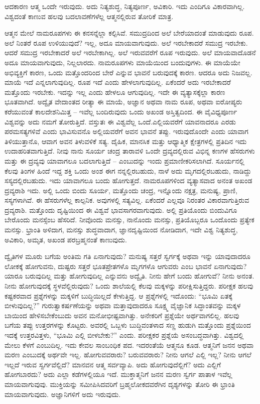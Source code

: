 ಆದಕಾರಣ ಆತ್ಮ ಒಂದೇ ಇರುವುದು. ಅದು ನಿತ್ಯಶುದ್ಧ, ನಿತ್ಯಪೂರ್ಣ, ಅವಿಕಾರಿ. ಇದು ಎಂದಿಗೂ ವಿಕಾರವಾಗಿಲ್ಲ. ವಿಶ್ವದಂತೆ ಕಾಣುವ ಹಲವು ಬದಲಾವಣೆಗಳೆಲ್ಲ ಆತ್ಮನಲ್ಲಿರುವ ತೋರಿಕೆ ಮಾತ್ರ.

ಆತ್ಮನ ಮೇಲೆ ನಾಮರೂಪಗಳು ಈ ಕನಸನ್ನೆಲ್ಲಾ ಕಲ್ಪಿಸಿವೆ. ಸಮುದ್ರದಿಂದ ಅಲೆ ಬೇರೆಯಾದಂತೆ ಮಾಡುವುದು ರೂಪ. ಅಲೆ ನಿಂತರೆ ರೂಪ ಉಳಿಯುವುದೆ? ಇಲ್ಲ, ಅದೂ ಮಾಯವಾಗುವುದು. ಅಲೆ ಇರಬೇಕಾದರೆ ಸಮುದ್ರ ಇರಬೇಕು. ಆದರೆ ಸಮುದ್ರ ಇರಬೇಕಾದರೆ ಅಲೆ ಇರಬೇಕಾಗಿಲ್ಲ. ಅಲೆ ಇರುವವರೆಗೆ ರೂಪ ಇರುವುದು. ಅಲೆ ಮಾಯವಾದೊಡನೆ ಅದೂ ಮಾಯವಾಗುವುದು, ನಿಲ್ಲಲಾರದು. ನಾಮರೂಪಗಳು ಮಾಯೆಯಿಂದ ಬಂದುವುಗಳು. ಈ ಮಾಯೆಯೇ ಅಭಿವ್ಯಕ್ತಿಗೆ ಕಾರಣ, ಒಂದು ಮತ್ತೊಂದರಿಂದ ಬೇರೆ ಎನ್ನುವ ಭಾವನೆ ಬರುವುದಕ್ಕೆ ಕಾರಣ. ಆದರೂ ಅದು ನಿಜವಲ್ಲ. ಮಾಯೆ ಇದೆ ಎನ್ನಲಾಗುವುದಿಲ್ಲ. ರೂಪ ಇದೆ ಎಂದು ಹೇಳಲಾಗುವುದಿಲ್ಲ. ಏಕೆಂದರೆ ಅದು ಇರಬೇಕಾದರೆ ಮತ್ತೊಂದು ಇರಬೇಕು. ಇದನ್ನು ಇಲ್ಲ ಎಂದು ಹೇಳಲೂ ಆಗುವುದಿಲ್ಲ. ಇದೇ ಈ ವ್ಯತ್ಯಾಸಕ್ಕೆಲ್ಲಾ ಕಾರಣ ಭೂತವಾಗಿದೆ. ಅದ್ವೈತ ವೇದಾಂತದ ರೀತ್ಯಾ ಈ ಮಾಯೆ, ಅಜ್ಞಾನ ಅಥವಾ ನಾಮ ರೂಪ, ಅಥವಾ ಐರೋಪ್ಯರು ಕರೆಯುವಂತೆ ಕಾಲದೇಶನಿಮಿತ್ತ – ಇವೆಲ್ಲ ಬಂದಿರುವುದು ಒಂದು ಅಖಂಡ ಅಸ್ತಿತ್ವದಿಂದ. ಈ ವೈವಿಧ್ಯಪೂರ್ಣ ವಿಶ್ವವನ್ನು ಅದು ನಮಗೆ ತೋರುತ್ತಿದೆ. ವಸ್ತುತಃ ಈ ವಿಶ್ವವೆಲ್ಲ ಒಂದೆ.ಎಲ್ಲಿಯವರೆಗೆ ಯಾವನಾದರೂ ಎರಡು ಪರಮಸತ್ಯಗಳಿವೆ ಎಂದು ಭಾವಿಸುವನೊ ಅಲ್ಲಿಯವರೆಗೆ ಅವನ ಭಾವನೆ ತಪ್ಪು. ಇರುವುದೊಂದೇ ಎಂದು ಯಾವಾಗ ತಿಳಿಯುತ್ತಾನೊ, ಆವಾಗ ಅವನ ತಿಳುವಳಿಕೆ ಸತ್ಯ. ದೈಹಿಕ, ಮಾನಸಿಕ ಮತ್ತು ಆಧ್ಯಾತ್ಮಿಕ ಕ್ಷೇತ್ರಗಳಲ್ಲಿ ಪ್ರತಿದಿನ ಇದು ಉದಾಹರಿತವಾಗುತ್ತಿದೆ. ನೀವು ನಾನು ಸೂರ್ಯ ಚಂದ್ರ ತಾರಾವಳಿ ಒಂದೇ ದ್ರವ್ಯದಲ್ಲಿರುವ ವಿಭಿನ್ನ ಕಣಗಳ ಹೆಸರುಗಳು ಮತ್ತು ಈ ದ್ರವ್ಯವು ಯಾವಾಗಲೂ ಬದಲಾಗುತ್ತಿದೆ – ಎಂಬುದನ್ನು ಇಂದು ಪ್ರಮಾಣೀಕರಿಸಲಾಗಿದೆ. ಸೂರ್ಯನಲ್ಲಿ ಕೆಲವು ತಿಂಗಳ ಹಿಂದೆ ಇದ್ದ ಶಕ್ತಿ ಒಂದು ಅಂಶ ಈಗ ನನ್ನಲ್ಲಿರಬಹುದು, ನಾಳೆ ಅದು ಮೃಗದಲ್ಲಿರಬಹುದು, ನಾಡಿದ್ದು ಸಸ್ಯದಲ್ಲಿರಬಹುದು. ಇದು ಯಾವಾಗಲೂ ಬಂದು ಹೋಗುತ್ತದೆ. ನಾಮರೂಪಗಳಿಂದ ವ್ಯತ್ಯಾಸವಾದ ಅನಂತ ಅಖಂಡ ದ್ರವ್ಯರಾಶಿ ಇದು. ಅಲ್ಲಿ ಒಂದು ಬಿಂದು ಸೂರ್ಯ, ಮತ್ತೊಂದು ಚಂದ್ರ, ಇನ್ನೊಂದು ನಕ್ಷತ್ರ, ಮನುಷ್ಯ, ಪ್ರಾಣಿ, ಸಸ್ಯಗಳಾಗಿವೆ. ಈ ಹೆಸರುಗಳೆಲ್ಲ ಕಾಲ್ಪನಿಕ. ಅವುಗಳಲ್ಲಿ ಸತ್ಯವಿಲ್ಲ. ಏಕೆಂದರೆ ಎಲ್ಲವೂ ನಿರಂತರ ವಿಕಾರವಾಗುತ್ತಿರುವ ದ್ರವ್ಯರಾಶಿ. ಮತ್ತೊಂದು ದೃಷ್ಟಿಯಿಂದ ಈ ವಿಶ್ವವೆ ಭಾವಸಾಗರವಾಗುವುದು. ಅಲ್ಲಿ ಪ್ರತಿಯೊಂದು ಬಿಂದುವಿಗೂ ಬೇರೊಂದು ಮನಸ್ಸೆಂಬ ಹೆಸರಿದೆ. ನೀವೊಂದು ಮನಸ್ಸು, ನಾನೊಂದು ಮನಸ್ಸು, ಪ್ರತಿಯೊಬ್ಬರೂ ಒಂದೊಂದು ಪ್ರತ್ಯೇಕ ಮನಸ್ಸು. ಭ್ರಾಂತಿ ಅಳಿದಾಗ, ಮನಸ್ಸು ಶುದ್ಧವಾದಾಗ, ಜ್ಞಾನದೃಷ್ಟಿಯಿಂದ ನೋಡಿದಾಗ, ಇದೇ ವಿಶ್ವ ನಿತ್ಯಶುದ್ಧ, ಅವಿಕಾರಿ, ಅಮೃತ, ಅಖಂಡ ಪರಬ್ರಹ್ಮನಂತೆ ಕಾಣುವುದು.

ದ್ವೈತಿಗಳ ಮೂರು ಬಗೆಯ ಅಂತಿಮ ಗತಿ ಏನಾಗುವುದು? ಮನುಷ್ಯ ಸತ್ತರೆ ಸ್ವರ್ಗಕ್ಕೆ ಅಥವಾ ಇನ್ನು ಯಾವುದಾದರೂ ಲೋಕಕ್ಕೆ ಹೋಗುವನು, ದುಷ್ಟರು ಸತ್ತರೆ ಭೂತಪ್ರೇತಗಳೊ ಮೃಗಗಳೊ ಆಗುವರು ಎಂಬ ಭಾವನೆ ಏನಾಗುವುದು? ಯಾರೂ ಬರುವುದಿಲ್ಲ ಮತ್ತು ಹೋಗುವುದಿಲ್ಲ ಎನ್ನುವನು ಅದ್ವೈತಿ. ನೀನು ಹೇಗೆ ಬಂದು ಹೋಗುವೆ? ನೀನು ಅನಂತ. ನೀನು ಹೋಗುವುದಕ್ಕೆ ಸ್ಥಳವೆಲ್ಲಿರುವುದು? ಒಂದು ಶಾಲೆಯಲ್ಲಿ ಕೆಲವು ಮಕ್ಕಳನ್ನು ಪರೀಕ್ಷಿಸುತ್ತಿದ್ದರು. ಪರೀಕ್ಷಕ ಹಲವು ಕಷ್ಟಕರವಾದ ಪ್ರಶ್ನೆಗಳನ್ನು ಮಕ್ಕಳಿಗೆ ಬುದ್ಧಿಯಿಲ್ಲದೆ ಕೇಳುತ್ತಿದ್ದ. ಆ ಪ್ರಶ್ನೆಗಳಲ್ಲಿ ಇದೊಂದು: “ಭೂಮಿ ಏತಕ್ಕೆ ಬೀಳುವುದಿಲ್ಲ?” ಗುರುತ್ವಾಕರ್ಷಣೆಯನ್ನು ಅಥವಾ ಮತ್ತಾವುದಾದರೂ ಸೂಕ್ಷ್ಮ ವೈಜ್ಞಾನಿಕ ಸಿದ್ಧಾಂತವನ್ನು ಮಕ್ಕಳ ಬಾಯಿಂದ ಹೇಳಿಸಬೇಕೆಂಬುದು ಅವನ ಮನೋಭೀಷ್ಟವಾಗಿತ್ತು. ಅನೇಕರಿಗೆ ಪ್ರಶ್ನೆಯೇ ಅರ್ಥವಾಗಲಿಲ್ಲ. ಹಲವು ಬಗೆಯ ತಪ್ಪು ಉತ್ತರಗಳನ್ನು ಕೊಟ್ಟರು. ಅವರಲ್ಲಿ ಒಬ್ಬಳು ಬುದ್ಧಿವಂತಳಾದ ಸಣ್ಣ ಹುಡುಗಿ ಮತ್ತೊಂದು ಪ್ರಶ್ನೆಯಿಂದ ಇದಕ್ಕೆ ಉತ್ತರವಿತ್ತಳು, “ಭೂಮಿ ಎಲ್ಲಿ ಬೀಳಬೇಕು?” ಎಂದು. ಪರೀಕ್ಷಕರ ಪ್ರಶ್ನೆಯೆ ಅಸಂಬದ್ಧವಾಗಿತ್ತು. ವಿಶ್ವದಲ್ಲಿ ಮೇಲು ಕೆಳಗೆ ಎಂಬುದಿಲ್ಲ. ಇದು ಕೇವಲ ಸಾಂಬಂಧಿಕ ಪದ. ಇದರಂತೆಯೆ ಆತ್ಮನೂ ಕೂಡ. ಆತ್ಮನಿಗೆ ಜನನ ಅಥವಾ ಮರಣ ಎಂಬುದಕ್ಕೆ ಅರ್ಥವೇ ಇಲ್ಲ. ಹೋಗುವವರಾರು? ಬರುವವರಾರು? ನೀನು ಆಗಲೆ ಎಲ್ಲಿ ಇಲ್ಲ? ನೀನು ಆಗಲೆ ಇಲ್ಲದೆ ಇರುವ ಸ್ವರ್ಗವೆಲ್ಲಿದೆ? ಮಾನವನ ಆತ್ಮ ಸರ್ವವ್ಯಾಪಿ. ಅದು ಹೋಗುವುದೆಲ್ಲಿಗೆ? ಅದು ಎಲ್ಲಿಗೆ ಹೋಗಬಾರದು? ಅದು ಎಲ್ಲಾ ಕಡೆಗಳಲ್ಲಿಯೂ ಇದೆ. ಮುಕ್ತಾತ್ಮನಿಗೆ ಜನನ ಮರಣ ಸ್ವರ್ಗ ಪಾತಾಳ ಇವೆಲ್ಲ ಮಾಯವಾಗುವುವು. ಮುಕ್ತಿಯನ್ನು ಸಮೀಪಿಸಿದವರಿಗೆ ಬ್ರಹ್ಮಲೋಕದವರೆಗಿನ ದೃಶ್ಯಗಳನ್ನು ತೋರಿ ಈ ಭ್ರಾಂತಿ ಮಾಯವಾಗುವುದು. ಅಜ್ಞಾನಿಗಳಿಗೆ ಅದು ಇರುವುದು.

